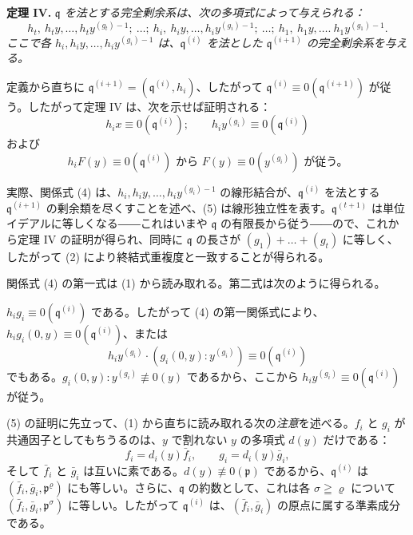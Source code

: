 \textbf{定理 IV.} \emph{\(\mathfrak{q}\) を法とする完全剰余系は、次の多項式によって与えられる：}
\[
h_t,\ h_ty,\ldots,h_ty^{(g_t)-1};\ \ldots;\
h_i,\ h_iy,\ldots,h_iy^{(g_i)-1};\ \ldots;\
h_1,\ h_1y,\ldots.\ h_1y^{(g_1)-1}.
\]
\emph{ここで各 \(h_i,h_iy,\ldots,h_iy^{(g_i)-1}\) は、\(\mathfrak{q}^{(i)}\) を法とした \(\mathfrak{q}^{(i+1)}\) の完全剰余系を与える。}

定義から直ちに \(\mathfrak{q}^{(i+1)}=(\mathfrak{q}^{(i)},h_i)\)、したがって \(\mathfrak{q}^{(i)}\equiv0(\mathfrak{q}^{(i+1)})\) が従う。したがって定理 IV は、次を示せば証明される：
\begin{equation}
\tag{4}
h_i x\equiv0(\mathfrak{q}^{(i)});\qquad
h_i y^{(g_i)}\equiv0(\mathfrak{q}^{(i)})
\end{equation}
および
\begin{equation}
\tag{5}
 h_iF(y)\equiv0(\mathfrak{q}^{(i)})
 \text{ から }F(y)\equiv0(y^{(g_i)})\text{ が従う。}
\end{equation}

実際、関係式 (4) は、\(h_i,h_iy,\ldots,h_iy^{(g_i)-1}\) の線形結合が、\(\mathfrak{q}^{(i)}\) を法とする \(\mathfrak{q}^{(i+1)}\) の剰余類を尽くすことを述べ、(5) は線形独立性を表す。\(\mathfrak{q}^{(t+1)}\) は単位イデアルに等しくなる――これはいまや \(\mathfrak{q}\) の有限長から従う――ので、これから定理 IV の証明が得られ、同時に \(\mathfrak{q}\) の長さが \((g_1)+\ldots+(g_t)\) に等しく、したがって (2) により終結式重複度と一致することが得られる。

関係式 (4) の第一式は (1) から読み取れる。第二式は次のように得られる。

\(h_ig_i\equiv0(\mathfrak{q}^{(i)})\) である。したがって (4) の第一関係式により、\(h_ig_i(0,y)\equiv0(\mathfrak{q}^{(i)})\)、または
\[
h_iy^{(g_i)}\cdot(g_i(0,y):y^{(g_i)})\equiv0(\mathfrak{q}^{(i)})
\]
でもある。\(g_i(0,y):y^{(g_i)}\not\equiv0(y)\) であるから、ここから \(h_iy^{(g_i)}\equiv0(\mathfrak{q}^{(i)})\) が従う。

(5) の証明に先立って、(1) から直ちに読み取れる次の\emph{注意}を述べる。\(f_i\) と \(g_i\) が共通因子としてもちうるのは、\(y\) で割れない \(y\) の多項式 \(d(y)\) だけである：
\[
f_i=d_i(y)\bar f_i,\qquad g_i=d_i(y)\bar g_i,
\]
そして \(\bar f_i\) と \(\bar g_i\) は互いに素である。\(d(y)\not\equiv0(\mathfrak{p})\) であるから、\(\mathfrak{q}^{(i)}\) は \((\bar f_i,\bar g_i,\mathfrak{p}^\varrho)\) にも等しい。さらに、\(\mathfrak{q}\) の約数として、これは各 \(\sigma\geqq\varrho\) について \((\bar f_i,\bar g_i,\mathfrak{p}^\sigma)\) に等しい。したがって \(\mathfrak{q}^{(i)}\) は、\((\bar f_i,\bar g_i)\) の原点に属する準素成分である。


